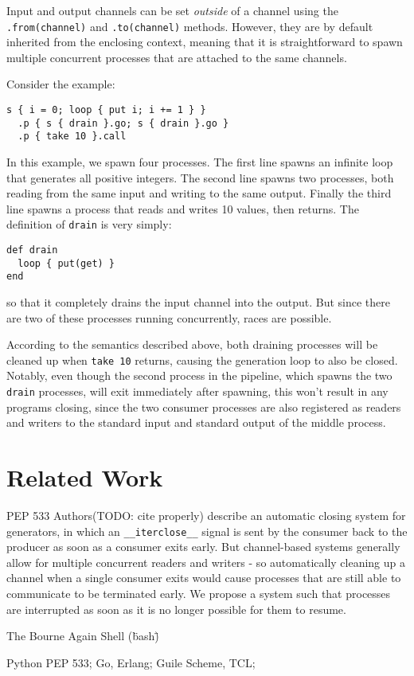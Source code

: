 \documentclass[format=sigconf, review=true, draft=true, screen=true]{acmart}
\begin{document}
Input and output channels can be set \emph{outside} of a channel using the \verb/.from(channel)/ and \verb/.to(channel)/ methods.
However, they are by default inherited from the enclosing context, meaning that it is straightforward to spawn multiple concurrent processes that are attached to the same channels.

Consider the example:

\begin{verbatim}
s { i = 0; loop { put i; i += 1 } }
  .p { s { drain }.go; s { drain }.go }
  .p { take 10 }.call
\end{verbatim}
In this example, we spawn four processes.
The first line spawns an infinite loop that generates all positive integers.
The second line spawns two processes, both reading from the same input and writing to the same output.
Finally the third line spawns a process that reads and writes 10 values, then returns. The definition of \verb/drain/ is very simply:

\begin{verbatim}
def drain
  loop { put(get) }
end
\end{verbatim}
so that it completely drains the input channel into the output.
But since there are two of these processes running concurrently, races are possible.

According to the semantics described above, both draining processes will be cleaned up when \verb/take 10/ returns, causing the generation loop to also be closed.
Notably, even though the second process in the pipeline, which spawns the two \verb/drain/ processes, will exit immediately after spawning, this won't result in any programs closing, since the two consumer processes are also registered as readers and writers to the standard input and standard output of the middle process.




\section{Related Work}

PEP 533 Authors(TODO: cite properly) describe an automatic closing system for generators, in which an \verb/__iterclose__/ signal is sent by the consumer back to the producer as soon as a consumer exits early.
But channel-based systems generally allow for multiple concurrent readers and writers - so automatically cleaning up a channel when a single consumer exits would cause processes that are still able to communicate to be terminated early.
We propose a system such that processes are interrupted as soon as it is no longer possible for them to resume.

The Bourne Again Shell (\"bash\")

Python PEP 533; Go, Erlang; Guile Scheme, TCL;
\end{document}
